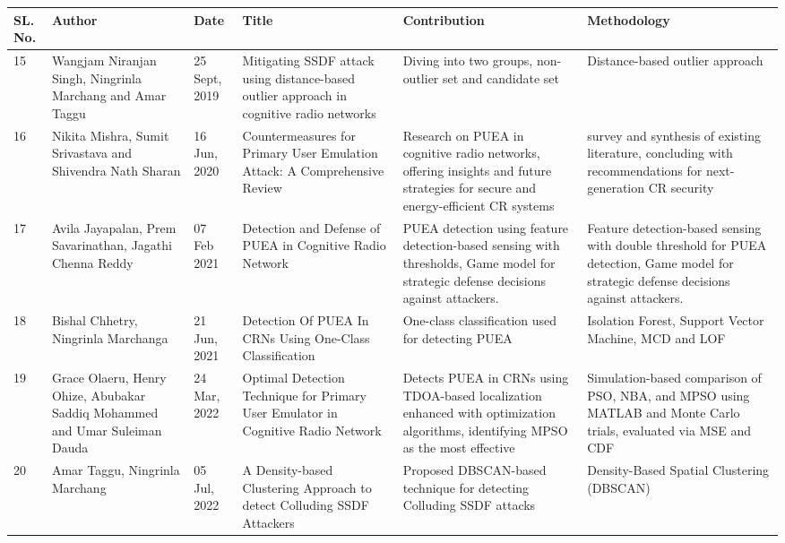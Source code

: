 \begin{table}[]
    \centering
\begin{tabular}{|p{0.5cm}|p{2.5cm}|p{1.1cm}|p{2.8cm}|p{2.8cm}|p{2.8cm}|}
\hline
\textbf{SL. No.} & \textbf{Author} & \textbf{Date} & \textbf{Title} & \textbf{Contribution} & \textbf{Methodology} \\
\hline
15 & Wangjam Niranjan Singh, Ningrinla Marchang
and Amar Taggu & 25 Sept, 2019 & Mitigating SSDF attack using distance-based outlier approach in cognitive radio networks & Diving into two groups, non-outlier set and candidate set
 & Distance-based outlier approach \\
 \hline
 16 & Nikita Mishra, Sumit Srivastava and Shivendra Nath Sharan & 16 Jun, 2020 & Countermeasures for Primary User Emulation Attack: A Comprehensive Review & Research on PUEA in cognitive radio networks, offering insights and future strategies for secure and energy-efficient CR systems & survey and synthesis of existing literature, concluding with recommendations for next-generation CR security \\
\hline
17 & Avila Jayapalan, Prem Savarinathan, Jagathi Chenna Reddy & 07 Feb 2021 & Detection and Defense of PUEA in Cognitive Radio Network & PUEA detection using feature detection-based sensing with thresholds, Game model for strategic defense decisions against attackers. & Feature detection-based sensing with double threshold for PUEA detection, Game model for strategic defense decisions against attackers. 
\\
\hline
18 & Bishal Chhetry, Ningrinla Marchanga & 21 Jun, 2021 & Detection Of PUEA In CRNs Using One-Class Classification & One-class classification used for detecting PUEA & Isolation Forest, Support Vector Machine, MCD and LOF \\
\hline
19 & Grace Olaeru, Henry Ohize, Abubakar Saddiq Mohammed and Umar Suleiman Dauda & 24 Mar, 2022 & Optimal Detection Technique for Primary User Emulator in Cognitive Radio Network & Detects PUEA in CRNs using TDOA-based localization enhanced with optimization algorithms, identifying MPSO as the most effective & Simulation-based comparison of PSO, NBA, and MPSO using MATLAB and Monte Carlo trials, evaluated via MSE and CDF \\
\hline
20 & Amar Taggu, Ningrinla Marchang & 05 Jul, 2022 & A Density-based Clustering Approach to detect Colluding SSDF Attackers & Proposed DBSCAN-based technique for detecting Colluding SSDF attacks & Density-Based Spatial Clustering (DBSCAN) \\


\end{tabular}
\end{table}
